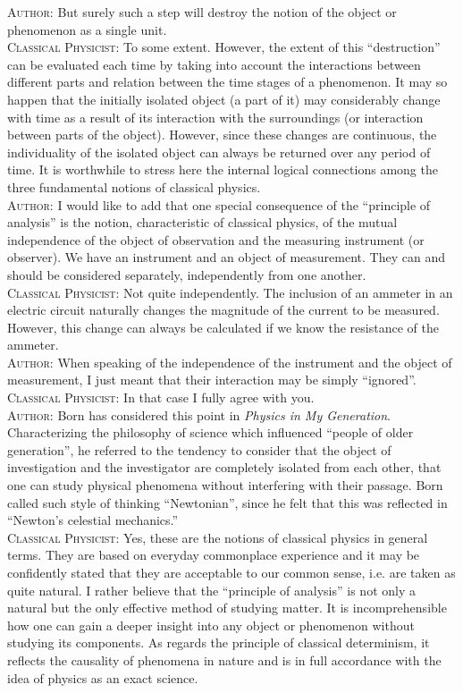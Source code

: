 \documentclass[a4paper,sfsidenotes,colorlinks=true]{tufte-book}
\numberwithin{equation}{section}
\numberwithin{figure}{section}
\begin{document}
\textsc{Author:} But surely such a step will destroy the notion of the object or phenomenon as a single unit.
\\
\textsc{Classical Physicist:} To some extent. However, the extent of this ``destruction'' can be evaluated each time by taking into account the interactions between different parts and relation between the time stages of a phenomenon. It may so happen that the initially isolated object (a part of it) may considerably change with time as a result of its interaction with the surroundings (or interaction between parts of the object). However, since these changes are continuous, the individuality of the isolated object can always be returned over any period of time. It is worthwhile to stress here the internal logical connections among the three fundamental notions of classical physics.
\\
\textsc{Author:} I would like to add that one special consequence of the ``principle of analysis'' is the notion, characteristic of classical physics, of the mutual independence of the object of observation and the measuring instrument (or observer). We have an instrument and an object of measurement. They can and should be considered separately, independently from one another.
\\
\textsc{Classical Physicist:} Not quite independently. The inclusion of an ammeter in an electric circuit naturally changes the magnitude of the current to be measured. However, this change can always be calculated if we know the resistance of the ammeter.
\\
\textsc{Author:} When speaking of the independence of the instrument and the object of measurement, I just meant that their interaction may be simply ``ignored''.
\\
\textsc{Classical Physicist:} In that case I fully agree with you.
\\
\textsc{Author:} Born has considered this point in \emph{Physics in My
Generation}.\cite{born-1956} Characterizing the philosophy of science which influenced ``people of older generation'', he referred to the tendency to consider that the object of investigation and the investigator are completely isolated from each other, that one can study physical phenomena without interfering with their passage. Born called such style of thinking ``Newtonian'', since he felt that this was reflected in ``Newton's celestial mechanics.''
\\
\textsc{Classical Physicist:} Yes, these are the notions of classical physics in general terms. They are based on everyday commonplace experience and it may be confidently stated that they are acceptable to our common sense, i.e. are taken as quite natural. I rather believe that the ``principle of analysis'' is not only a natural but the only effective method of studying matter. It is incomprehensible how one can gain a deeper insight into any object or phenomenon without studying its components. As regards the principle of classical determinism, it reflects the causality of phenomena in nature and is in full accordance with the idea of physics as an exact science.
\end{document}
